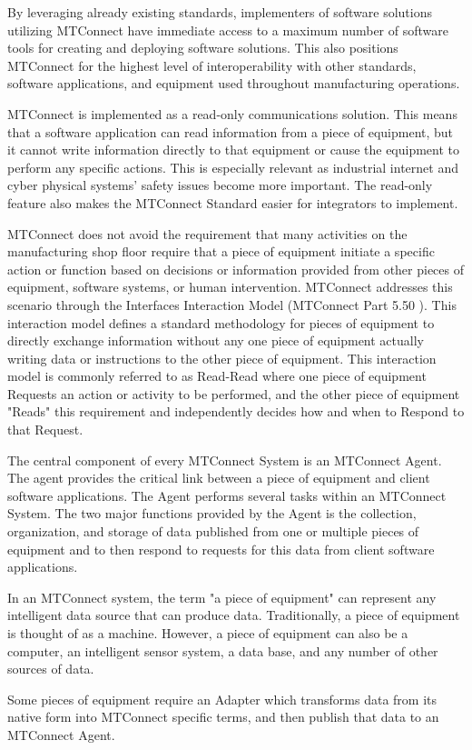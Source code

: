 By leveraging already existing standards, implementers of software solutions utilizing MTConnect have immediate access to a maximum number of software tools for creating and deploying software solutions.   This also positions MTConnect for the highest level of interoperability with other standards, software applications, and equipment used throughout manufacturing operations.    
 
MTConnect is implemented as a read-only communications solution.   This means that a software application can read information from a piece of equipment, but it cannot write information directly to that equipment or cause the equipment to perform any specific actions.  This is especially relevant as industrial internet and cyber physical systems' safety issues become more important.  The read-only feature also makes the MTConnect Standard easier for integrators to implement. 
 
MTConnect does not avoid the requirement that many activities on the manufacturing shop floor require that a piece of equipment initiate a specific action or function based on decisions or information provided from other pieces of equipment, software systems, or human intervention.   MTConnect addresses this scenario through the Interfaces Interaction Model (MTConnect Part 5.50 \cite{MTCPart5}).   This interaction model defines a standard methodology for pieces of equipment to directly exchange information without any one piece of equipment actually writing data or instructions to the other piece of equipment. This interaction model is commonly referred to as Read-Read where one piece of equipment Requests an action or activity to be performed, and the other piece of equipment "Reads" this requirement and independently decides how and when to Respond to that Request. 

The central component of every MTConnect System is an MTConnect Agent.  The agent provides the critical link between a piece of equipment and client software applications. The Agent performs several tasks within an MTConnect System.   The two major functions provided by the Agent is the collection, organization, and storage of data published from one or multiple pieces of equipment and to then respond to requests for this data from client software applications. 


\FloatBarrier
 
In an MTConnect system, the term "a piece of equipment" can represent any intelligent data source that can produce data.  Traditionally, a piece of equipment is thought of as a machine. However, a piece of equipment can also be a computer, an intelligent sensor system, a data base, and any number of other sources of data. 
 
Some pieces of equipment require an Adapter which transforms data from its native form into MTConnect specific terms, and then publish that data to an MTConnect Agent.    
